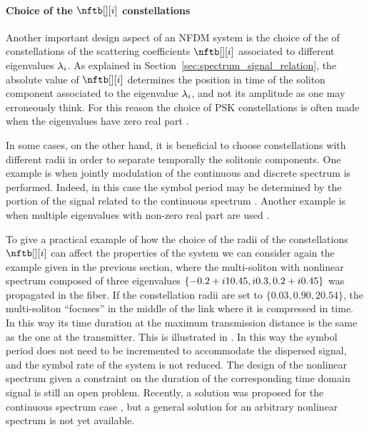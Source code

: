 \paragraph{Choice of the $\nftb[][i]$ constellations}
Another important design aspect of an \ac{NFDM}
system is the choice of the of constellations of the scattering coefficients
$\nftb[][i]$ associated to different eigenvalues $\eig[i]$.
As explained in Section~\ref{sec:spectrum_signal_relation}, the absolute value
of $\nftb[][i]$ determines the position in time of the soliton component associated
to the eigenvalue $\eig[i]$, and not its amplitude as one may erroneously think. For
this reason the choice of \ac{PSK} constellations is often made when the
eigenvalues have zero real part \cite{buelow2016transmission}.


In some cases, on the other hand, it is beneficial to choose constellations with different radii in order to
separate temporally the solitonic components. One example is when jointly
modulation of the continuous and discrete spectrum is performed. Indeed, in this case the symbol period may
be determined by the portion of the signal related to the continuous spectrum \cite{aref2016demonstration}. Another example is when multiple eigenvalues with non-zero real part are used \cite{buelow2016transmission}.

To give a practical example of how the choice of the radii of the constellations $\nftb[][i]$ can affect the properties of the system we can consider again the example given in the previous section, where the multi-soliton with nonlinear spectrum composed of three eigenvalues $\{-0.2+ \iunit 10.45, \iunit 0.3, 0.2+ \iunit 0.45\}$ was propagated in the fiber. If the constellation radii are set to $\{0.03, 0.90, 20.54\}$,  the multi-soliton ``focuses'' in the middle of the link where it is compressed in time. In this way its time duration at the maximum transmission distance is the same as the one at the transmitter. This is illustrated in . In this way the symbol period \Ts{} does not need to be incremented to accommodate the dispersed signal, and the symbol rate of the system is not reduced. The design of the nonlinear spectrum given a constraint on the duration of the corresponding time domain signal is still an open problem.  Recently, a solution was proposed for the continuous spectrum case \cite{WahlsECOC2017}, but a general solution for an arbitrary nonlinear spectrum is not yet available.



